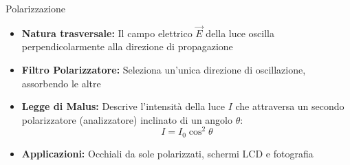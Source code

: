 \begin{frame}{Polarizzazione}
    \begin{itemize}
        \item \textbf{Natura trasversale:} Il campo elettrico $\vec{E}$ della luce oscilla perpendicolarmente alla direzione di propagazione
        \item \textbf{Filtro Polarizzatore:} Seleziona un'unica direzione di oscillazione, assorbendo le altre
        \item \textbf{Legge di Malus:}  Descrive l'intensità della luce $I$ che attraversa un secondo polarizzatore (analizzatore) inclinato di un angolo $\theta$: $$I = I_0 \cos^2 \theta$$
        \item \textbf{Applicazioni:} Occhiali da sole polarizzati, schermi LCD e fotografia
    \end{itemize}
\end{frame}